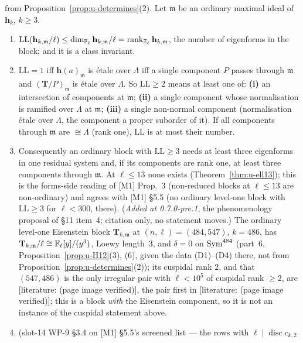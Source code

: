 \documentclass[11pt]{article}
\newcommand{\LIT}[1]{\textsf{[literature: #1]}}   %
\newcommand{\Iw}{\Lambda}                         %
\newcommand{\hcusp}{\mathbf{h}}                   %
\newcommand{\Tu}{\mathbf{T}}                      %
\newcommand{\Zl}{\Z_\ell}
\newcommand{\LL}{\mathrm{LL}}                     %
\begin{document}
\begin{proposition}\label{prop:u-loewy}
\PROVED{} from Proposition~\ref{prop:u-determines}(2). Let $\mathfrak m$ be an ordinary maximal ideal of $\hcusp_k$, $k\ge3$.
\begin{enumerate}
\item $\LL(\hcusp_{k,\mathfrak m}/\ell)\le\dim_{\Fl}\hcusp_{k,\mathfrak m}/\ell=\rank_{\Zl}\hcusp_{k,\mathfrak m}$, the number of eigenforms in the block; and it is a
  class invariant.
\item $\LL=1$ iff $\hcusp(a)_{\mathfrak m}$ is étale over $\Iw$ iff a single component $P$ passes through $\mathfrak m$ and $(\Tu/P)_{\mathfrak m}$ is étale over $\Iw$.
  So $\LL\ge2$ means at least one of: \textbf{(i)} an intersection of components at $\mathfrak m$; \textbf{(ii)} a single component whose normalisation is
  ramified over $\Iw$ at $\mathfrak m$; \textbf{(iii)} a single non-normal component (normalisation étale over $\Iw$, the component a proper suborder of it).
  If all components through $\mathfrak m$ are $\cong\Iw$ (rank one), $\LL$ is at most their number.
\item Consequently an ordinary block with $\LL\ge3$ needs at least three eigenforms in one residual system and, if its components are rank one, at least three
  components through $\mathfrak m$. At $\ell\le13$ none exists (Theorem~\ref{thm:u-ell13}); this is the forms-side reading of [M1] Prop.~3 (non-reduced blocks at
  $\ell\le13$ are non-ordinary) and agrees with [M1] \S5.5 (no ordinary level-one block with $\LL\ge3$ for $\ell<300$, \COMP{} there).
  (\emph{Added at 0.7.0-pre.1}, the phenomenology proposal of  \S11 item~4; citation only, no statement moves.)
  The ordinary level-one Eisenstein block $\Tu_{k,\mathfrak m}$ at $(n,\ell)=(484,547)$, $k=486$, has $\Tu_{k,\mathfrak m}/\ell\cong\Fl[y]/(y^{3})$, Loewy length~$3$, and
  $\delta=0$ on $\mathrm{Sym}^{484}$ (part~6, Proposition~\ref{prop:u-H12}(3), (6), \PROVED{} given the data (D1)--(D4) there, not from Proposition~\ref{prop:u-determines}(2));
  its cuspidal rank $2$, and that $(547,486)$ is the only irregular pair with $\ell<10^{5}$ of cuspidal rank $\ge2$, are \LIT{\cite[\S1.1, arXiv v1, p.~2]{bellaiche_pollack} (page
  image verified)}, the pair first in \LIT{\cite[p.~68]{calegari_eisdef} (page image verified)}; this is a block \emph{with} the Eisenstein component, so it is not an
  instance of the cuspidal statement above.
\item \COMP{} (slot-14 WP-9 \S3.4 on [M1] \S5.5's screened list  --- the rows with $\ell\mid\operatorname{disc}c_{k,2}$

\end{enumerate}
\end{proposition}
\end{document}
